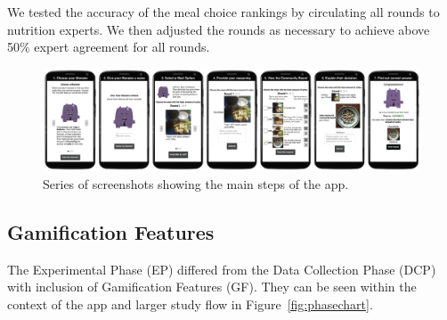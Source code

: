 

We tested the accuracy of the meal choice rankings by circulating all rounds to nutrition experts. 
We then adjusted the rounds as necessary to achieve above 50\% expert agreement for all rounds. 



\begin{figure}[h]
\includegraphics[width=\textwidth]{samples/images/figure-3.png}
\caption{Series of screenshots showing the main steps of the app.}
\label{fig:screenshots}
\end{figure}





\subsection{Gamification Features}
The Experimental Phase (EP) differed from the Data Collection Phase (DCP) with inclusion of Gamification Features (GF). 
They can be seen within the context of the app and larger study flow in Figure~\ref{fig:phasechart}.

